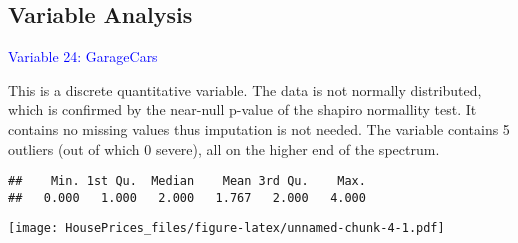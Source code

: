 \documentclass[
]{article}
\newenvironment{Shaded}{\begin{snugshade}}{\end{snugshade}}
\newcommand{\AttributeTok}[1]{\textcolor[rgb]{0.13,0.29,0.53}{#1}}
\newcommand{\CommentTok}[1]{\textcolor[rgb]{0.56,0.35,0.01}{\textit{#1}}}
\newcommand{\ConstantTok}[1]{\textcolor[rgb]{0.56,0.35,0.01}{#1}}
\newcommand{\FunctionTok}[1]{\textcolor[rgb]{0.13,0.29,0.53}{\textbf{#1}}}
\newcommand{\NormalTok}[1]{#1}
\newcommand{\SpecialCharTok}[1]{\textcolor[rgb]{0.81,0.36,0.00}{\textbf{#1}}}
\newcommand{\StringTok}[1]{\textcolor[rgb]{0.31,0.60,0.02}{#1}}
\begin{document}
\hypertarget{variable-analysis}{%
\subsection{Variable Analysis}\label{variable-analysis}}

\textcolor{blue}{Variable 24: GarageCars}

This is a discrete quantitative variable. The data is not normally
distributed, which is confirmed by the near-null p-value of the shapiro
normallity test. It contains no missing values thus imputation is not
needed. The variable contains 5 outliers (out of which 0 severe), all on
the higher end of the spectrum.

\begin{Shaded}
\end{Shaded}

\begin{verbatim}
##    Min. 1st Qu.  Median    Mean 3rd Qu.    Max. 
##   0.000   1.000   2.000   1.767   2.000   4.000
\end{verbatim}

\begin{Shaded}
\end{Shaded}

\texttt{[image: HousePrices\_files/figure-latex/unnamed-chunk-4-1.pdf]}

\begin{Shaded}
\end{Shaded}
\end{document}
